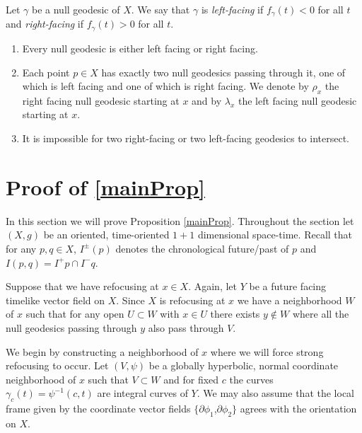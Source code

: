 \begin{defin}
Let $\gamma$ be a null geodesic of $X$.  We say that $\gamma$ is \emph{left-facing} if $f_\gamma(t) < 0$ for all $t$ and \emph{right-facing} if $f_\gamma(t) > 0$ for all $t$. 
\end{defin}

\begin{rem}
\begin{enumerate}
\item Every null geodesic is either left facing or right facing.
\item Each point $p\in X$ has exactly two null geodesics passing through it, one of which is left facing and one of which is right facing.  We denote by $\rho_x$ the right facing null geodesic starting at $x$ and by $\lambda_x$ the left facing null geodesic starting at $x$.
\item It is impossible for two right-facing or two left-facing geodesics to intersect.
\end{enumerate}
\end{rem}



\section{Proof of \ref{mainProp}}
In this section we will prove Proposition \ref{mainProp}.  Throughout the section let $(X, g)$ be an oriented, time-oriented $1+1$ dimensional space-time.  Recall that for any $p,q\in X$, $I^\pm(p)$ denotes the chronological future/past of $p$ and $I(p,q) = I^+p \cap I^-q$.


Suppose that we have refocusing at $x\in X$.  Again, let $Y$ be a future facing timelike vector field on $X$.  Since $X$ is refocusing at $x$ we have a neighborhood $W$ of $x$ such that for any open $U\subset W$ with $x\in U$ there exists $y\notin W$ where all the null geodesics passing through $y$ also pass through $V$.  

We begin by constructing a neighborhood of $x$ where we will force strong refocusing to occur.  Let $(V, \psi)$ be a globally hyperbolic, normal coordinate neighborhood of $x$ such that $V\subset W$ and for fixed $c$ the curves $\gamma_c(t) = \psi^{-1}(c, t)$ are integral curves of $Y$. We may also assume that the local frame given by the coordinate vector fields $\{\partial \phi_1$,$\partial\phi_2\}$ agrees with the orientation on $X$.  

